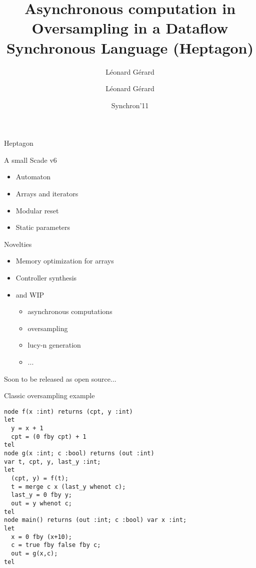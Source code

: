 \documentclass[xcolor=dvipsnames]{beamer}
\title{Asynchronous computation in \lustre}
\author{L\'eonard G\'erard}
\title{Oversampling in a Dataflow Synchronous Language (Heptagon)}
\author{Léonard Gérard\inst{1}}
\institute[Universities of]
{
\inst{1}%
PARKAS team\\
ENS}
\date{Synchron'11}
\begin{document}
\begin{frame}
\titlepage
\end{frame}

\begin{frame}[fragile]{Heptagon}
\begin{block}{A small Scade v6}
\begin{itemize}
      \item Automaton
      \item Arrays and iterators
      \item Modular reset
      \item Static parameters
\end{itemize}
\end{block}
\begin{block}{Novelties}
\begin{itemize}
  \item Memory optimization for arrays
  \item Controller synthesis
  \item and WIP
    \begin{itemize}
      \item asynchronous computations
      \item oversampling
      \item lucy-n generation
      \item ...
    \end{itemize}
\end{itemize}
\end{block}
Soon to be released as open source...
\end{frame}

\begin{frame}[fragile]{Classic oversampling example}
\begin{lstlisting}[escapechar=!]
node f(x :int) returns (cpt, y :int)
let
  y = x + 1
  cpt = (0 fby cpt) + 1
tel
node g(x :int; c :bool) returns (out :int)
var t, cpt, y, last_y :int;
let
  (cpt, y) = f(t);
  t = merge c x (last_y whenot c);
  last_y = 0 fby y;
  out = y whenot c;
tel
node main() returns (out :int; c :bool) var x :int;
let
  x = 0 fby (x+10);
  c = true fby false fby c;
  out = g(x,c);
tel
\end{lstlisting}
\end{frame}
\end{document}
